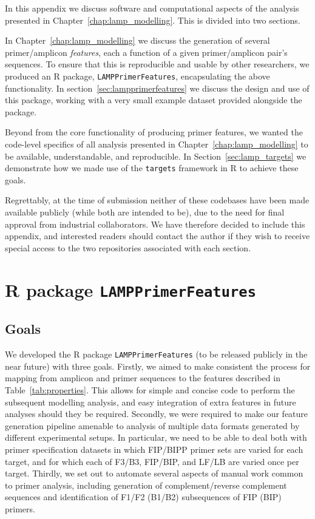 \documentclass[../thesis.tex]{subfiles}
\begin{document}
In this appendix we discuss software and computational aspects of the analysis presented in Chapter~\ref{chap:lamp_modelling}. This is divided into two sections. 

In Chapter~\ref{chap:lamp_modelling} we discuss the generation of several primer/amplicon \emph{features}, each a function of a given primer/amplicon pair's sequences. To ensure that this is reproducible and usable by other researchers, we produced an R package, \texttt{LAMPPrimerFeatures}, encapsulating the above functionality. In section~\ref{sec:lampprimerfeatures} we discuss the design and use of this package, working with a very small example dataset provided alongside the package. 

Beyond from the core functionality of producing primer features, we wanted the code-level specifics of all analysis presented in Chapter~\ref{chap:lamp_modelling} to be available, understandable, and reproducible. In Section~\ref{sec:lamp_targets} we demonstrate how we made use of the \texttt{targets} framework in R to achieve these goals.

Regrettably, at the time of submission neither of these codebases have been made available publicly (while both are intended to be), due to the need for final approval from industrial collaborators. We have therefore decided to include this appendix, and interested readers should contact the author if they wish to receive special access to the two repositories associated with each section.


\section{R package \texttt{LAMPPrimerFeatures} \label{sec:lampprimerfeatures}}

\subsection{Goals}
We developed the R package \texttt{LAMPPrimerFeatures} (to be released publicly in the near future) with three goals. Firstly, we aimed to make consistent the process for mapping from amplicon 
and primer sequences to the features described in Table~\ref{tab:properties}. This allows for simple and concise code to perform the subsequent modelling analysis, and easy integration of extra features in future analyses should they be required. Secondly, we were required to make our feature generation pipeline amenable to analysis of multiple data formats generated by different experimental setups. In particular, we need to be able to deal both with primer specification datasets in which FIP/BIPP primer sets are varied for each target, and for which each of F3/B3, FIP/BIP, and LF/LB are varied once per target. Thirdly, we set out to automate several aspects of manual work common to primer analysis, including generation of complement/reverse complement sequences and identification of F1/F2 (B1/B2) subsequences of FIP (BIP) primers.
\end{document}
